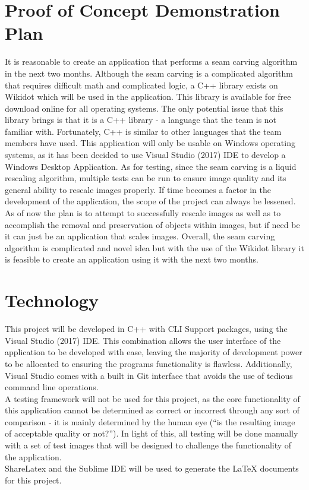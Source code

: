 \documentclass{article}
\begin{document}
\section{Proof of Concept Demonstration Plan}
It is reasonable to create an application that performs a seam carving algorithm in the next two months. Although the seam carving is a complicated algorithm that requires difficult math and complicated logic, a C++ library exists on Wikidot \cite{Libraries} which will be used in the application. This library is available for free download online for all operating systems. The only potential issue that this library brings is that it is a C++ library - a language that the team is not familiar with. Fortunately, C++ is similar to other languages that the team members have used. This application will only be usable on Windows operating systems, as it has been decided to use Visual Studio (2017) IDE to develop a Windows Desktop Application. As for testing, since the seam carving is a liquid rescaling algorithm, multiple tests can be run to ensure image quality and its general ability to rescale images properly. If time becomes a factor in the development of the application, the scope of the project can always be lessened. As of now the plan is to attempt to successfully rescale images as well as to accomplish the removal and preservation of objects within images, but if need be it can just be an application that scales images. Overall, the seam carving algorithm is complicated and novel idea but with the use of the Wikidot library it is feasible to create an application using it with the next two months.

\section{Technology}
This project will be developed in C++ with CLI Support packages, using the Visual Studio (2017) IDE. This combination allows the user interface of the application to be developed with ease, leaving the majority of development power to be allocated to ensuring the programs functionality is flawless. Additionally, Visual Studio comes with a built in Git interface that avoids the use of tedious command line operations.\\
A testing framework will not be used for this project, as the core functionality of this application cannot be determined as correct or incorrect through any sort of comparison - it is mainly determined by the human eye (“is the resulting image of acceptable quality or not?”). In light of this, all testing will be done manually with a set of test images that will be designed to challenge the functionality of the application.\\
ShareLatex and the Sublime IDE will be used to generate the LaTeX documents for this project.
\end{document}
